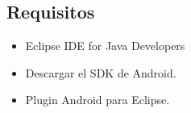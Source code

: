 \documentclass[a4paper,11pt]{article}
\begin{document}
    \subsection{ Requisitos}
\begin{itemize}
\item Eclipse IDE for Java Developers
\item Descargar el SDK de Android.
\item Plugin Android para Eclipse.
\end{itemize}


\begin{figure}[ht!]
 
   \centering
   \hspace{0.1\linewidth}
   \\[20pt]
    
\end{figure}
\end{document}
